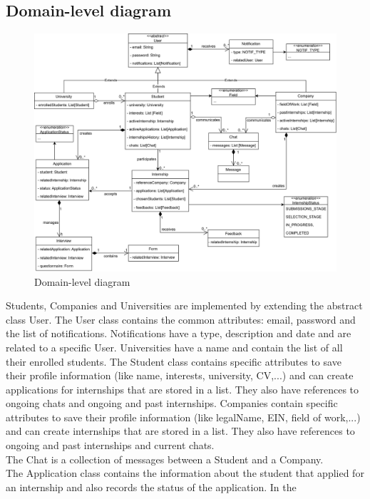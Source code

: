 \subsection{Domain-level diagram}\label{subsec:domain_level_diagram}
\begin{figure}[H]
    \centering
    \includegraphics[width=1\textwidth]{Images/UML_Class_diagram.png}
    \caption{Domain-level diagram}\label{fig:domain-lebel_diagram}
\end{figure}
Students, Companies and Universities are implemented by extending the abstract class User. The User class contains the common attributes: email, password and
the list of notifications. Notifications have a type, description and date and are related to a specific User. Universities have a name and contain the list 
of all their enrolled students. The Student class contains specific attributes to save their profile information (like name, interests, university, CV,...) 
and can create applications for internships that are stored in a list. They also have references to ongoing chats and ongoing and past internships. 
Companies contain specific attributes to save their profile information (like legalName, EIN, field of work,...) and can create internships that are stored in
a list. They also have references to ongoing and past internships and current chats. \\
The Chat is a collection of messages between a Student and a Company. \\
The Application class contains the information about the student that applied for an internship and also records the status of the application. In the
